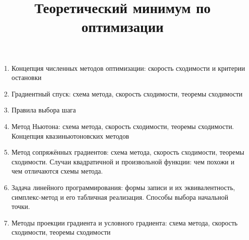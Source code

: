 \documentclass[12pt]{article}
\begin{document}
\title{Теоретический минимум по оптимизации}
\author{}
\date{}

\maketitle
\thispagestyle{empty}
\vspace{-2cm}
\begin{enumerate}
\item Концепция численных методов оптимизации: скорость сходимости и критерии остановки
\item Градиентный спуск: схема метода, скорость сходимости, теоремы сходимости
\item Правила выбора шага
\item Метод Ньютона: схема метода, скорость сходимости, теоремы сходимости. Концепция квазиньютоновских методов
\item Метод сопряжённых градиентов: схема метода, скорость сходимости, теоремы сходимости. Случаи квадратичной и произвольной функции: чем похожи и чем отличаются схемы метода.
\item Задача линейного программирования: формы записи и их эквивалентность, симплекс-метод и его табличная реализация. Способы выбора начальной точки.
\item Методы проекции градиента и условного градиента: схема метода, скорость сходимости, теоремы сходимости


\end{enumerate}
\end{document}
